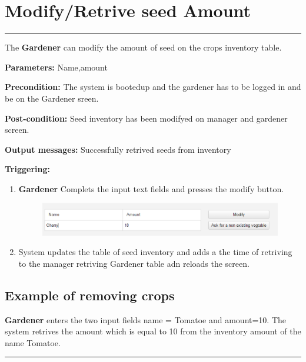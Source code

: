\break

\section{Modify/Retrive seed Amount}

\hrule
\hfill
\vspace{0.5cm}
\label{operation:modifySeedAmount}


The \textbf{Gardener} can modify the amount of seed on the crops inventory
table.
\begin{description}
\item \textbf{Parameters:} Name,amount
\item \textbf{Precondition:} The system is bootedup and the gardener has to be
logged in and be on the Gardener sreen.
\item \textbf{Post-condition:} Seed inventory has been modifyed on manager and
gardener screen.
\item \textbf{Output messages:} Successfully retrived seeds from inventory
\item \textbf{Triggering:}
\begin{enumerate}
\item \textbf{Gardener} Complets the input text fields and presses the modify
button.
\begin{figure}[H]
\includegraphics[width=1\textwidth]{images/RetriveCropsBase.eps}
\end{figure}
\item System updates the table of seed inventory and adds a the time of
retriving to the manager retriving Gardener table adn reloads the screen.
\end{enumerate}
\end{description}

\subsection{Example of removing crops}
\textbf{Gardener} enters the two input fields name = Tomatoe and amount=10.
The system retrives the amount which is equal to 10 from the inventory amount of
the name Tomatoe.
\hfill
\vspace{0.5cm}
\hrule





